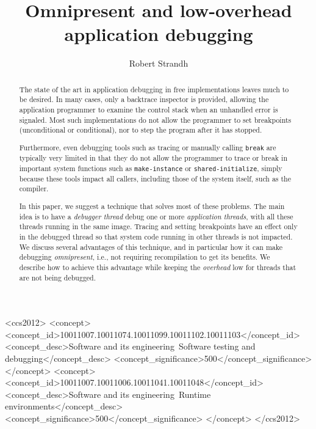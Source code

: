 \documentclass[format=sigconf]{acmart}
\begin{document}
\title{Omnipresent and low-overhead application debugging}

\author{Robert Strandh}


\begin{abstract}
The state of the art in application debugging in free \commonlisp{}
implementations leaves much to be desired.  In many cases, only a
backtrace inspector is provided, allowing the application programmer
to examine the control stack when an unhandled error is signaled.
Most such implementations do not allow the programmer to set
breakpoints (unconditional or conditional), nor to step the program
after it has stopped.

Furthermore, even debugging tools such as tracing or manually calling
\texttt{break} are typically very limited in that they do not allow
the programmer to trace or break in important system functions such as
\texttt{make-instance} or \texttt{shared-initialize}, simply because
these tools impact all callers, including those of the system itself,
such as the compiler.

In this paper, we suggest a technique that solves most of these
problems.  The main idea is to have a \emph{debugger thread} debug one
or more \emph{application threads}, with all these threads running in
the same image.  Tracing and setting breakpoints have an effect only
in the debugged thread so that system code running in other threads is
not impacted.  We discuss several advantages of this technique, and in
particular how it can make debugging \emph{omnipresent}, i.e., not
requiring recompilation to get its benefits.  We describe how to
achieve this advantage while keeping the \emph{overhead} low for
threads that are not being debugged.
\end{abstract}


\begin{CCSXML}
<ccs2012>
<concept>
<concept_id>10011007.10011074.10011099.10011102.10011103</concept_id>
<concept_desc>Software and its engineering~Software testing and debugging</concept_desc>
<concept_significance>500</concept_significance>
</concept>
<concept>
<concept_id>10011007.10011006.10011041.10011048</concept_id>
<concept_desc>Software and its engineering~Runtime environments</concept_desc>
<concept_significance>500</concept_significance>
</concept>
</ccs2012>
\end{CCSXML}
\end{document}
